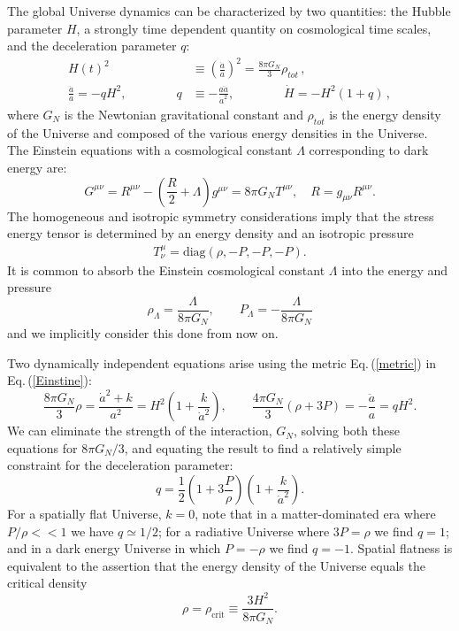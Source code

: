 \documentclass[universe,article,submit,moreauthors,pdftex,a4paper]{Definitions/mdpi}
\newcommand{\beqn}{\begin{equation}}
\newcommand{\eeqn}{\end{equation}}
\newcommand{\req}[1]{Eq.\,(\ref{#1})}
\begin{document}
The global Universe dynamics can be characterized by two  quantities: the Hubble parameter  $H$, a strongly time dependent quantity on cosmological time scales,  and the deceleration parameter $q$:
\begin{align}
  \label{Hubble} H(t)^{2}&\equiv\left(\frac{\dot a}{a}\right)^2=\frac{8\pi G_{N}}{3}\rho_{tot}\,,\\
  \label{Deceleration} \frac{\ddot a}{a}=-qH^2,\qquad\qquad q&\equiv -\frac{a\ddot a}{\dot a^2},\qquad\qquad \dot H=-H^2(1+q)\,,    
\end{align}
where $G_{N}$ is the Newtonian gravitational constant and $\rho_{tot}$ is the energy density of the Universe and composed of the various energy densities in the Universe. The Einstein equations with a cosmological constant $\Lambda$ corresponding to dark energy are:
\beqn\label{Einstine}
G^{\mu\nu}=R^{\mu\nu}-\left(\frac R 2 +\Lambda\right) g^{\mu\nu}=8\pi G_N T^{\mu\nu},  
\quad R= g_{\mu\nu}R^{\mu\nu}.
\eeqn
The homogeneous and isotropic symmetry considerations imply that the stress energy tensor is determined by an energy density and an isotropic pressure
\begin{align}
 T^\mu_\nu =\mathrm{diag}(\rho, -P, -P, -P).
\end{align}
It is common to absorb the Einstein cosmological constant $\Lambda$ into the energy and pressure
\beqn\label{EpsLam}
\rho_\Lambda=\frac{\Lambda}{8\pi G_N}, \qquad P_\Lambda=-\frac{\Lambda}{8\pi G_N}
\eeqn
and we implicitly consider this done from now on.

Two dynamically independent equations arise using the metric \req{metric} in \req{Einstine}:
\beqn\label{hubble}
\frac{8\pi G_N}{3} \rho =  \frac{\dot a^2+k}{a^2}
=H^2\left( 1+\frac { k }{\dot a^2}\right),
\qquad
\frac{4\pi G_N}{3} (\rho+3P)  =-\frac{\ddot a}{a}=qH^2.
\eeqn
We can eliminate the strength of the interaction, $G_N$,  solving both these equations for ${8\pi G_N}/{3}$, and equating the result to find a relatively simple constraint for the deceleration parameter:
\beqn\label{qparam}
q=\frac 1 2 \left(1+3\frac{P}{\rho}\right)\left(1+\frac{k}{\dot a^2}\right).
\eeqn
For a spatially flat Universe, $k=0$, note that in a  matter-dominated era where $P/\rho<<1$ we have $q\simeq 1/2$; for a radiative Universe where $3P=\rho$ we find $q= 1 $; and  in a dark energy Universe in which $P=-\rho$  we find $q=-1$.  Spatial flatness is equivalent to the assertion that the energy density of the Universe equals the critical density
\begin{equation}\label{crit_density}
\rho=\rho_{\text{crit}}\equiv \frac{3H^2}{8\pi G_N}.
\end{equation}
\end{document}
